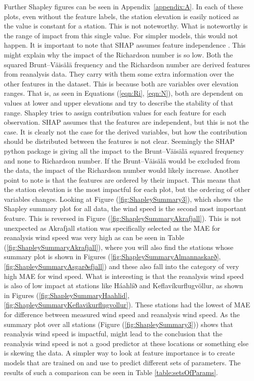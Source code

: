 Further Shapley figures can be seen in Appendix~\ref{appendix:A}. In each of these plots, even without the feature labels, the station elevation is easily noticed as the value is constant for a station. This is not noteworthy. What is noteworthy is the range of impact from this single value. For simpler models, this would not happen. It is important to note that SHAP assumes feature independence \cite{Salih_2024}. This might explain why the impact of the Richardson number is so low. Both the squared Brunt–Väisälä frequency and the Richardson number are derived features from reanalysis data. They carry with them some extra information over the other features in the dataset. This is because both are variables over elevation ranges. That is, as seen in Equations (\ref{eqn:Ri}, \ref{eqn:N}), both are dependent on values at lower and upper elevations and try to describe the stability of that range. Shapley tries to assign contribution values for each feature for each observation. SHAP assumes that the features are independent, but this is not the case. It is clearly not the case for the derived variables, but how the contribution should be distributed between the features is not clear. Seemingly the SHAP python package is giving all the impact to the Brunt–Väisälä squared frequency and none to Richardson number. If the Brunt–Väisälä would be excluded from the data, the impact of the Richardson number would likely increase. Another point to note is that the features are ordered by their impact. This means that the station elevation is the most impactful for each plot, but the ordering of other variables changes. Looking at Figure (\ref{fig:ShapleySummary3}), which shows the Shapley summary plot for all data, the wind speed is the second most important feature. This is reversed in Figure (\ref{fig:ShapleySummaryAkrafjall}). This is not unexpected as Akrafjall station was specifically selected as the MAE for reanalysis wind speed was very high as can be seen in Table (\ref{fig:ShapleySummaryAkrafjall}), where you will also find the stations whose summary plot is shown in Figures (\ref{fig:ShapleySummaryAlmannaskarð}, \ref{fig:ShapleySummaryAsgarðsfjall}) and these also fall into the category of very high MAE for wind speed. What is interesting is that the reanalysis wind speed is also of low impact at stations like Háahlíð and Keflavíkurflugvöllur, as shown in Figures (\ref{fig:ShapleySummaryHaahlid}, \ref{fig:ShapleySummaryKeflavikurflugvollur}). These stations had the lowest of MAE for difference between measured wind speed and reanalysis wind speed. As the summary plot over all stations (Figure (\ref{fig:ShapleySummary3})) shows that reanalysis wind speed is impactful, might lead to the conclusion that the reanalysis wind speed is not a good predictor at these locations or something else is skewing the data. A simpler way to look at feature importance is to create models that are trained on and use to predict different sets of parameters. The results of such a comparison can be seen in Table \ref{table:setsOfParams}.

